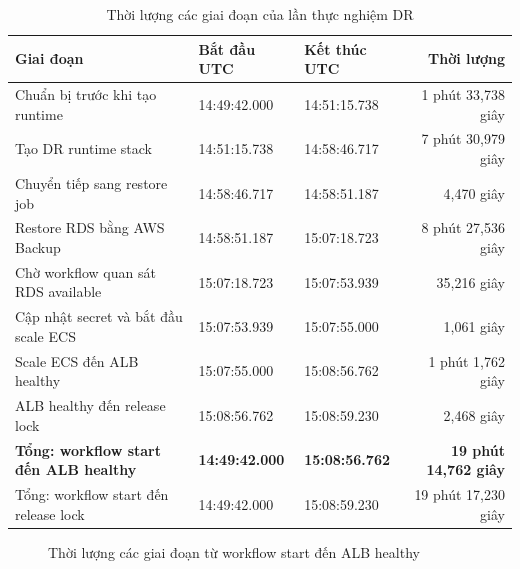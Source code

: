 \begin{table}[H]
\centering
\caption{Thời lượng các giai đoạn của lần thực nghiệm DR}
\label{tab:experiment-timeline}
\begin{tabularx}{\textwidth}{@{}p{4.2cm}p{3.2cm}p{3.2cm}r@{}}
\toprule
\textbf{Giai đoạn} & \textbf{Bắt đầu UTC} & \textbf{Kết thúc UTC} & \textbf{Thời lượng} \\
\midrule
Chuẩn bị trước khi tạo runtime & 14:49:42.000 & 14:51:15.738 & 1 phút 33,738 giây \\
Tạo DR runtime stack & 14:51:15.738 & 14:58:46.717 & 7 phút 30,979 giây \\
Chuyển tiếp sang restore job & 14:58:46.717 & 14:58:51.187 & 4,470 giây \\
Restore RDS bằng AWS Backup & 14:58:51.187 & 15:07:18.723 & 8 phút 27,536 giây \\
Chờ workflow quan sát RDS available & 15:07:18.723 & 15:07:53.939 & 35,216 giây \\
Cập nhật secret và bắt đầu scale ECS & 15:07:53.939 & 15:07:55.000 & 1,061 giây \\
Scale ECS đến ALB healthy & 15:07:55.000 & 15:08:56.762 & 1 phút 1,762 giây \\
ALB healthy đến release lock & 15:08:56.762 & 15:08:59.230 & 2,468 giây \\
\midrule
\textbf{Tổng: workflow start đến ALB healthy} & \textbf{14:49:42.000} & \textbf{15:08:56.762} & \textbf{19 phút 14,762 giây} \\
Tổng: workflow start đến release lock & 14:49:42.000 & 15:08:59.230 & 19 phút 17,230 giây \\
\bottomrule
\end{tabularx}
\end{table}

\begin{figure}[H]
\centering
{}
\caption{Thời lượng các giai đoạn từ workflow start đến ALB healthy}
\label{fig:recovery-stage-duration}
\end{figure}


